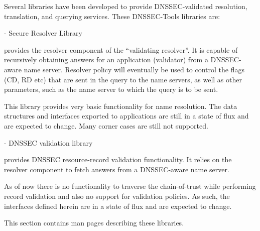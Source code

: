 
Several libraries have been developed to provide DNSSEC-validated resolution,
translation, and querying services.  These DNSSEC-Tools libraries are:

\begin{description}

\item{} - Secure Resolver Library

 provides the resolver component of the ``validating resolver''.
It is capable of recursively obtaining answers for an application (validator)
from a DNSSEC-aware name server.  Resolver policy will eventually be used to
control the flags (CD, RD etc) that are sent in the query to the name servers,
as well as other parameters, such as the name server to which the query is
to be sent.

This library provides very basic functionality for name resolution.  The data
structures and interfaces exported to applications are still in a state of
flux and are expected to change. Many corner cases are still not supported.

\item{} - DNSSEC validation library

 provides DNSSEC resource-record validation functionality.  It
relies on the resolver component to fetch answers from a DNSSEC-aware name
server.

As of now there is no functionality to traverse the chain-of-trust while
performing record validation and also no support for validation policies.
As such, the interfaces defined herein are in a state of flux and are
expected to change.

\end{description}

This section contains man pages describing these libraries.






